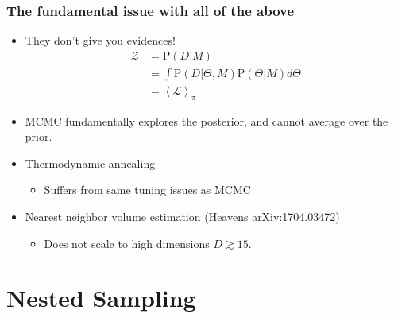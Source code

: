 \documentclass[%
]{beamer}
\newcommand{\lik}{\mathcal{L}}
\newcommand{\prior}{\pi}
\newcommand{\ev}{\mathcal{Z}}
\newcommand{\prob}{\mathrm{P}}
\begin{document}
\begin{frame}
  \frametitle{The fundamental issue with all of the above} 

  \begin{itemize}
    \item They don't give you evidences!
  \begin{align}
    \ev 
    &= \prob(D|M) 
    \nonumber\\
    &= \int\prob(D|\Theta,M)\prob(\Theta|M) d\Theta 
    \nonumber\\
    &= \left\langle \lik \right\rangle_\prior
    \nonumber
  \end{align}
    \item MCMC fundamentally explores the posterior, and cannot average over the prior.
    \item Thermodynamic annealing 
    \begin{itemize}
        \item Suffers from same tuning issues as MCMC
    \end{itemize}
    \item Nearest neighbor volume estimation (Heavens arXiv:1704.03472)
    \begin{itemize}
        \item Does not scale to high dimensions $D\gtrsim15$.
    \end{itemize}
  \end{itemize}
 
\end{frame}

\section{Nested Sampling}
\end{document}
